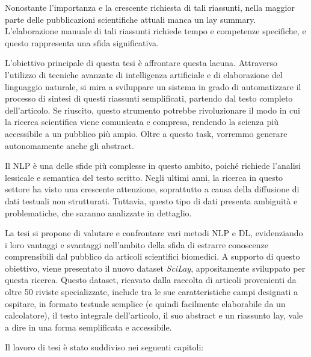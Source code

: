 \documentclass[12pt,a4paper,twoside,openright]{book}
\begin{document}
Nonostante l'importanza e la crescente richiesta di tali riassunti, nella maggior parte delle pubblicazioni scientifiche attuali manca un lay summary. L'elaborazione manuale di tali riassunti richiede tempo e competenze specifiche, e questo rappresenta una sfida significativa.

L'obiettivo principale di questa tesi è affrontare questa lacuna. Attraverso l'utilizzo di tecniche avanzate di intelligenza artificiale e di elaborazione del linguaggio naturale, si mira a sviluppare un sistema in grado di automatizzare il processo di sintesi di questi riassunti semplificati, partendo dal testo completo dell'articolo. Se riuscito, questo strumento potrebbe rivoluzionare il modo in cui la ricerca scientifica viene comunicata e compresa, rendendo la scienza più accessibile a un pubblico più ampio. Oltre a questo task, vorremmo generare autonomamente anche gli abstract.


Il NLP è una delle sfide più complesse in questo ambito, poiché richiede l'analisi lessicale e semantica del testo scritto. Negli ultimi anni, la ricerca in questo settore ha visto una crescente attenzione, soprattutto a causa della diffusione di dati testuali non strutturati. Tuttavia, questo tipo di dati presenta ambiguità e problematiche, che saranno analizzate in dettaglio.


La tesi si propone di valutare e confrontare vari metodi NLP e DL, evidenziando i loro vantaggi e svantaggi nell'ambito della sfida di estrarre conoscenze comprensibili dal pubblico da articoli scientifici biomedici.
A supporto di questo obiettivo, viene presentato il nuovo dataset \emph{SciLay}, appositamente sviluppato per questa ricerca. Questo dataset, ricavato dalla raccolta di articoli provenienti da oltre 50 riviste specializzate, include tra le sue caratteristiche campi designati a ospitare, in formato testuale semplice (e quindi facilmente elaborabile da un calcolatore), il testo integrale dell'articolo, il suo abstract e un riassunto lay, vale a dire in una forma semplificata e accessibile.


Il lavoro di tesi è stato suddiviso nei seguenti capitoli:
\end{document}
